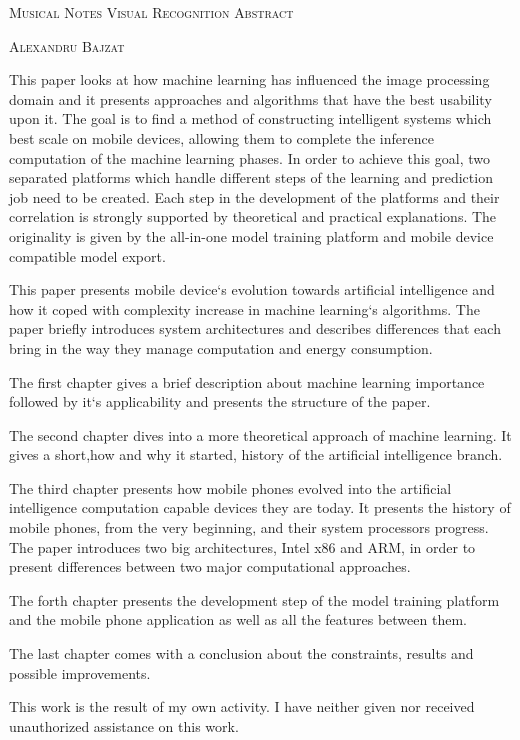 \documentclass[12pt,a4paper]{report}
\begin{document}
		\begin{center}
			\vspace{0.5cm}
			\Large \textsc{Musical Notes Visual Recognition}
			\vspace{0.5cm}
			\Large \textsc{Abstract}
		\end{center}
	\hfill \textsc{Alexandru Bajzat}
	\vspace{1.5cm}
	
	
	
	This paper looks at how machine learning has influenced the image processing domain and it presents approaches and algorithms that have the best usability upon it. The goal is to find a method of constructing intelligent systems which best scale on mobile devices, allowing them to complete the inference computation of the machine learning phases. In order to achieve this goal, two separated platforms which handle different steps of the learning and prediction job need to be created. Each step in the development of the platforms and their correlation is strongly supported by theoretical and practical explanations. The originality is given by the all-in-one model training platform and mobile device compatible model export.
	
	This paper presents mobile device`s evolution towards artificial intelligence and how it coped with complexity increase in machine learning`s algorithms. 
	The paper briefly introduces system architectures and describes differences that each bring in the way they manage computation and energy consumption.
	
	The first chapter gives a brief description about machine learning importance followed by it`s applicability and presents the structure of the paper.
	
	The second chapter dives into a more theoretical approach of machine learning. It gives a short,how and why it started, history of the artificial intelligence branch. 
	
	The third chapter presents how mobile phones evolved into the artificial intelligence computation capable devices they are today. It presents the history of mobile phones, from the very beginning, and their system processors progress. The paper introduces two big architectures, Intel x86 and ARM, in order to present differences between two major computational approaches.
	
	The forth chapter presents the development step of the model training platform and the mobile phone application as well as all the features between them.
	
	The last chapter comes with a conclusion about the constraints, results and possible improvements.
	
	This work is the result of my own activity. I have neither given nor received unauthorized assistance on
	this work.
\end{document}
